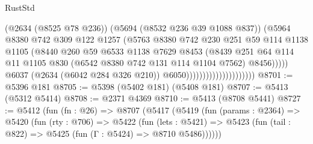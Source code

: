 \begin{lexlean}{RustStd}
\begin{coremodule}
                                                (@2634 (@8525 @78 @236))
                                                (@5694 (@8532 @236 @39 @1088 @837))
                                                (@5964
                                                  @8380
                                                  @742
                                                  @309
                                                  @122
                                                  @1257
                                                  (@5763
                                                    @8380
                                                    @742
                                                    @230
                                                    @251
                                                    @59
                                                    @114
                                                    @1138
                                                    @1105
                                                    (@8440
                                                      @260
                                                      @59
                                                      @6533
                                                      @1138
                                                      @7629
                                                      @8453
                                                      (@8439
                                                        @251
                                                        @64
                                                        @114
                                                        @11
                                                        @1105
                                                        @830
                                                        (@6542 @8380 @742 @131 @114 @1104 @7562)
                                                        @8456)))))
                                              @6037
                                              (@2634 (@6042 @284 @326 @210))
                                              @6050)))))))))))))))))))))
@8701 := @5396 @181
@8705 := @5398 (@5402 @181) (@5408 @181)
@8707 := @5413 (@5312 @5414)
@8708 := @2371 @4369
@8710 := @5413 (@8708 @5441)
@8727 := @5412
    (fun (fn : @26) =>
    @8707
      (@5417
        (@5419
          (fun (params : @2364) =>
          @5420
            (fun (rty : @706) =>
            @5422
              (fun (lets : @5421) =>
              @5423 (fun (tail : @822) => @5425 (fun (Γ : @5424) => @8710 @5486))))))

\end{coremodule}
\end{lexlean}

